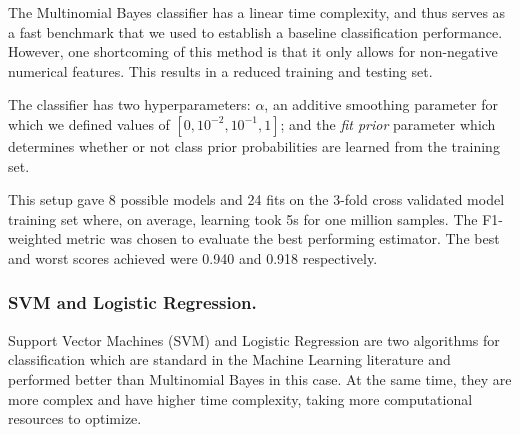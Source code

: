  The Multinomial Bayes classifier has a linear time complexity, and thus serves as a fast benchmark that we used to establish a baseline classification performance. However, one shortcoming of this method is that it only allows for non-negative numerical features. This results in a reduced training and testing set.
  
 The classifier has two hyperparameters: $\alpha$, an additive smoothing parameter for which we defined values of $[0,{10^{-2}},{10^{-1}},1]$; and the \textit{fit prior} parameter which determines whether or not class prior probabilities are learned from the training set. 
 
 This setup gave 8 possible models and 24 fits on the 3-fold cross validated model training set where, on average, learning took 5s for one million samples. The F1-weighted metric was chosen to evaluate the best performing estimator.
The best and worst scores achieved were 0.940 and 0.918 respectively. 



\subsubsection{SVM and Logistic Regression.}

Support Vector Machines (SVM) and Logistic Regression are two algorithms for classification which are standard in the Machine Learning literature and performed better than Multinomial Bayes in this case. 
At the same time, they are more complex and have higher time complexity, taking more computational resources to optimize.

